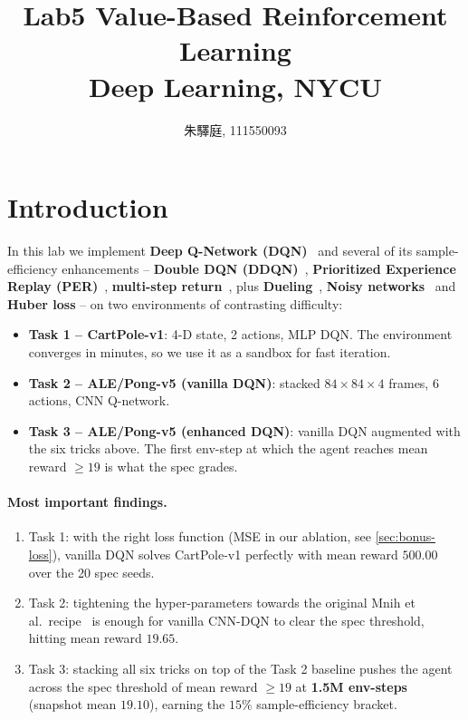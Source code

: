 \documentclass[10pt,twocolumn,letterpaper]{article}
\begin{document}
\title{\LARGE Lab5 Value-Based Reinforcement Learning \\[0.5em] \large Deep Learning, NYCU}
\author{朱驛庭, 111550093}
\maketitle

\section{Introduction}
\label{sec:intro}

In this lab we implement \textbf{Deep Q-Network (DQN)}~\cite{mnih2015dqn} and several of its sample-efficiency enhancements -- \textbf{Double DQN (DDQN)}~\cite{hasselt2016ddqn}, \textbf{Prioritized Experience Replay (PER)}~\cite{schaul2016per}, \textbf{multi-step return}~\cite{sutton2018rl}, plus \textbf{Dueling}~\cite{wang2016dueling}, \textbf{Noisy networks}~\cite{fortunato2018noisy} and \textbf{Huber loss} -- on two environments of contrasting difficulty:
\begin{itemize}
    \item \textbf{Task 1 -- CartPole-v1}: 4-D state, 2 actions, MLP DQN. The environment converges in minutes, so we use it as a sandbox for fast iteration.
    \item \textbf{Task 2 -- ALE/Pong-v5 (vanilla DQN)}: stacked $84{\times}84{\times}4$ frames, 6 actions, CNN Q-network.
    \item \textbf{Task 3 -- ALE/Pong-v5 (enhanced DQN)}: vanilla DQN augmented with the six tricks above. The first env-step at which the agent reaches mean reward $\geq 19$ is what the spec grades.
\end{itemize}

\paragraph{Most important findings.}
\begin{enumerate}
    \item Task 1: with the right loss function (MSE in our ablation, see \cref{sec:bonus-loss}), vanilla DQN solves CartPole-v1 perfectly with mean reward $500.00$ over the 20 spec seeds.
    \item Task 2: tightening the hyper-parameters towards the original Mnih et al.\ recipe~\cite{mnih2015dqn} is enough for vanilla CNN-DQN to clear the spec threshold, hitting mean reward $19.65$.
    \item Task 3: stacking all six tricks on top of the Task 2 baseline pushes the agent across the spec threshold of mean reward $\geq 19$ at \textbf{1.5M env-steps} (snapshot mean $19.10$), earning the $15\%$ sample-efficiency bracket.
\end{enumerate}
\end{document}
